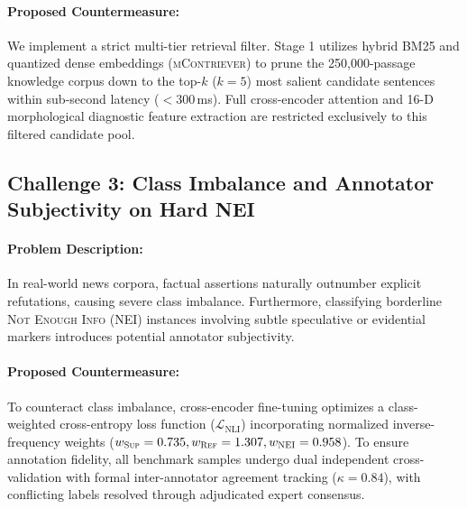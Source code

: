 \paragraph{Proposed Countermeasure:} We implement a strict multi-tier retrieval filter. Stage 1 utilizes hybrid BM25 and quantized dense embeddings (\textsc{mContriever}) to prune the 250,000-passage knowledge corpus down to the top-$k$ ($k=5$) most salient candidate sentences within sub-second latency ($<300$\,ms). Full cross-encoder attention and 16-D morphological diagnostic feature extraction are restricted exclusively to this filtered candidate pool.

\subsection{Challenge 3: Class Imbalance and Annotator Subjectivity on Hard NEI}
\paragraph{Problem Description:} In real-world news corpora, factual assertions naturally outnumber explicit refutations, causing severe class imbalance. Furthermore, classifying borderline \textsc{Not Enough Info} (NEI) instances involving subtle speculative or evidential markers introduces potential annotator subjectivity.
\paragraph{Proposed Countermeasure:} To counteract class imbalance, cross-encoder fine-tuning optimizes a class-weighted cross-entropy loss function ($\mathcal{L}_{\text{NLI}}$) incorporating normalized inverse-frequency weights ($w_{\textsc{Sup}} = 0.735, w_{\textsc{Ref}} = 1.307, w_{\textsc{NEI}} = 0.958$). To ensure annotation fidelity, all benchmark samples undergo dual independent cross-validation with formal inter-annotator agreement tracking ($\kappa = 0.84$), with conflicting labels resolved through adjudicated expert consensus.

